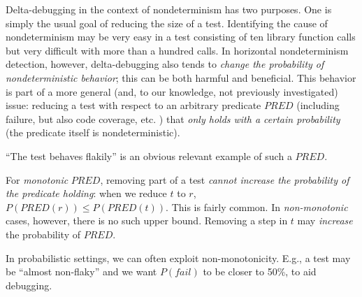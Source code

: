Delta-debugging in the context of nondeterminism has two
purposes.  One is simply the usual goal of reducing the size of a
test.  Identifying the cause of nondeterminism may be very easy in a
test consisting of ten library function calls but very difficult with
more than a hundred calls.  In horizontal nondeterminism detection, however,
delta-debugging also tends to \emph{change the probability of
  nondeterministic behavior}; this can be both harmful and
beneficial.  This behavior is part of a more general (and, to our
knowledge, not previously investigated) issue: reducing a test with
respect to an arbitrary predicate $\mathit{PRED}$ (including failure,
but also code coverage, etc. \cite{icst2014,stvrcausereduce,NonAdeq}) that \emph{only holds with a
certain probability} (the predicate itself is nondeterministic).

``The test behaves flakily'' is an obvious relevant example of such a $\mathit{PRED}$.

For \emph{monotonic} $\mathit{PRED}$, removing part of a test \emph{cannot
increase the probability of the predicate holding}: when we reduce $t$
to $r$, $P(\mathit{PRED}(r)) \leq P(\mathit{PRED}(t))$.  This is fairly
common.  In \emph{non-monotonic} cases,
however, there is no such upper bound.  Removing a step in $t$ may
\emph{increase} the probability of $\mathit{PRED}$.

In probabilistic
settings, we can often exploit non-monotonicity.  E.g., a test may be
``almost non-flaky'' and we want $P(\mathit{fail})$ to be closer to
50\%, to aid debugging.

